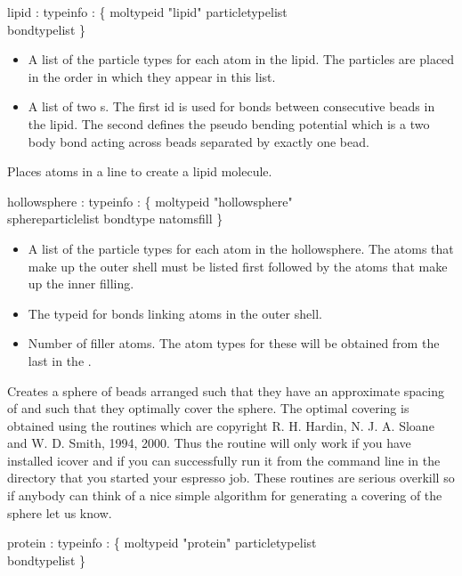 \begin{code}
  lipid  : typeinfo :  \{ moltypeid "lipid" particletypelist \\
           bondtypelist \}
\end{code}
\begin{itemize}
\item {} A list of the particle types for each
  atom in the lipid. The particles are placed in the order in which
  they appear in this list.
\item {} A list of two s. The first id
  is used for bonds between consecutive beads in the lipid. The second
   defines the pseudo bending potential which is a two
  body bond acting across beads separated by exactly one bead.
\end{itemize}
Places atoms in a line to create a lipid molecule.
\begin{code}
  hollowsphere : typeinfo : \{ moltypeid "hollowsphere" \\
                 sphereparticlelist bondtype natomsfill \}
\end{code}
\begin{itemize}
\item {} A list of the particle types for each
  atom in the hollowsphere. The atoms that make up the outer shell
  must be listed first followed by the atoms that make up the inner
  filling.
\item {} The typeid for bonds linking atoms in the outer
  shell.
\item {} Number of filler atoms. The atom types for
  these will be obtained from the last  in the
  .
\end{itemize}
Creates a sphere of beads arranged such that they have an approximate
spacing of  and such that they optimally cover the
sphere. The optimal covering is obtained using the 
routines which are copyright R. H. Hardin, N. J. A. Sloane and
W. D. Smith, 1994, 2000. Thus the routine will only work if you have
installed icover and if you can successfully run it from the command
line in the directory that you started your espresso job. These
routines are serious overkill so if anybody can think of a nice simple
algorithm for generating a covering of the sphere let us know.
\begin{code}
  protein : typeinfo : \{ moltypeid "protein" particletypelist\\
            bondtypelist \}
\end{code}
